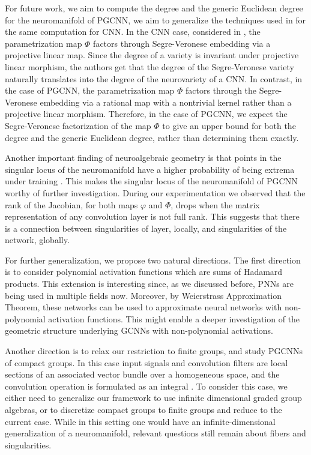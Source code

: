 \documentclass[final]{article}
\theoremstyle{definition}
\theoremstyle{plain}
\begin{document}
For future work, we aim to compute the degree and the generic Euclidean degree for the neuromanifold of PGCNN, we aim to generalize the techniques used in \cite{shahverdi2024geometryoptimizationpolynomialconvolutional} for the same computation for CNN.
In the CNN case, considered in \cite{shahverdi2024geometryoptimizationpolynomialconvolutional}, the parametrization map $\Phi$ factors through Segre-Veronese embedding via a projective linear map.
Since the degree of a variety is invariant under projective linear morphism, the authors get that the degree of the Segre-Veronese variety naturally translates into the degree of the neurovariety of a CNN.
In contrast, in the case of PGCNN, the parametrization map $\Phi$ factors through the Segre-Veronese embedding via a rational map with a nontrivial kernel rather than a projective linear morphism.
Therefore, in the case of PGCNN, we expect the Segre-Veronese factorization of the map $\Phi$ to give an upper bound for both the degree and the generic Euclidean degree, rather than determining them exactly.

Another important finding of neuroalgebraic geometry  is that points in the singular locus of the neuromanifold have a higher probability of being extrema under training \cite{marchetti2025algebraunveilsdeeplearning}.
This makes the singular locus of the neuromanifold of PGCNN worthy of further investigation.
During our experimentation we observed that the rank of the Jacobian, for both maps $\varphi$ and $\Phi$, drops when the matrix representation of any convolution layer is not full rank.
This suggests that there is a connection between singularities of layer, locally, and singularities of the network, globally.



For further generalization, we propose two natural directions. The first direction is to consider polynomial activation functions which are sums of Hadamard products. 
This extension is interesting since, as we discussed before, PNNs are being used in multiple fields now.
Moreover, by Weierstrass Approximation Theorem, these networks can be used to approximate neural networks with non-polynomial activation functions.
This might enable a deeper investigation of the geometric structure underlying GCNNs with non-polynomial activations.

Another direction is to relax our restriction to finite groups, and study PGCNNs of compact groups.
In this case input signals and convolution filters are local sections of an associated vector bundle over a homogeneous space, and the convolution operation is formulated as an integral \cite{10.5555/3454287.3455107}. 
To consider this case, we either need to generalize our framework to use infinite dimensional graded group algebras, or to discretize compact groups to finite groups and reduce to the current case.
While in this setting one would have an infinite-dimensional generalization of a neuromanifold, relevant questions still remain about fibers and singularities.
\end{document}
